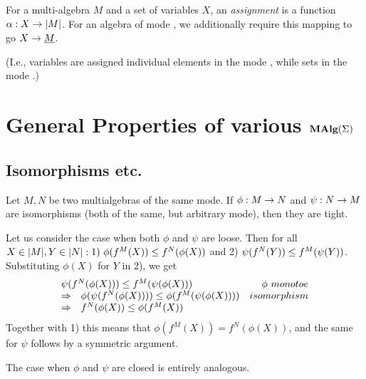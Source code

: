 %
\begin{Definition}
For a multi-algebra $M$ and a set of variables $X$, an {\em assignment} is
a function $\alpha:X\rightarrow|M|$. For an algebra of mode \PS, we
additionally require this mapping to go $X\rightarrow \underline {M}$.
\end{Definition}
(I.e., variables
are assigned individual elements in the mode \PS, while sets in the mode \SSs.)

%
%

\section{General Properties of various $\mbox{\rm\bf MAlg}(\Sigma)$}
\subsection{Isomorphisms etc.}

\begin{Lemma}\label{le:isotight}
Let $M, N$ be two multialgebras of the same mode. If $\phi:M\rightarrow N$
and $\psi:N\rightarrow M$ are isomorphisms (both of the same, but arbitrary
mode), then they are tight.
\end{Lemma}

\begin{Proof}
Let us consider the case when both $\phi$ and $\psi$ are loose. Then
for all $X\in |M|, Y\in |N|: 1)\ \phi(f^M(X))\leq
f^N(\phi(X))$ and 2) $\psi(f^N(Y))\leq f^M(\psi(Y))$.
Substituting $\phi(X)$ for $Y$ in 2), we get 
\[
\begin{array}{rlr}
\multicolumn{2}{l}{\psi(f^N(\phi(X))) \po f^M(\psi(\phi(X)))} & \phi\ monotoe\\
\impl & \phi(\psi(f^N(\phi(X)))) \po \phi(f^M(\psi(\phi(X)))) & isomorphism \\
\impl & f^N(\phi(X)) \po \phi(f^M(X))
\end{array} \]
Together with 1) this means that $\phi(f^M(X)) = f^N(\phi(X))$, and
the same for $\psi$ follows by a symmetric argument.

The case when $\phi$ and $\psi$ are closed is entirely analogous.
\end{Proof}

